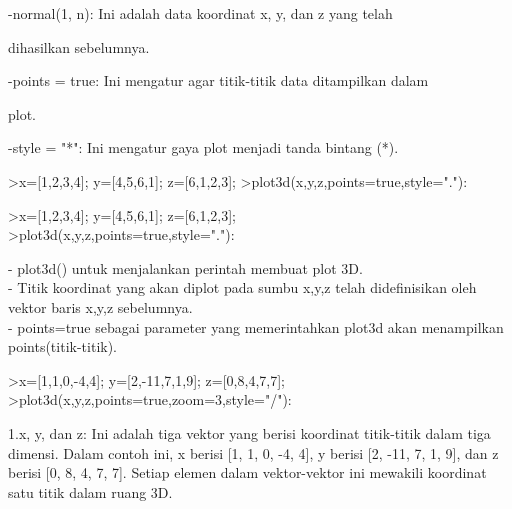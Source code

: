 \documentclass[a4paper,10pt]{article}
\begin{document}
\begin{eulernotebook}
\begin{eulercomment}
\begin{eulercomment}
\begin{eulercomment}
\begin{eulercomment}
\begin{eulercomment}
\begin{eulercomment}
\begin{eulercomment}
\begin{eulercomment}
\begin{eulercomment}
\end{eulercomment}
\begin{eulerttcomment}
 -normal(1, n): Ini adalah data koordinat x, y, dan z yang telah
\end{eulerttcomment}
\begin{eulercomment}
dihasilkan sebelumnya.\\
\end{eulercomment}
\begin{eulerttcomment}
 -points = true: Ini mengatur agar titik-titik data ditampilkan dalam
\end{eulerttcomment}
\begin{eulercomment}
plot.\\
\end{eulercomment}
\begin{eulerttcomment}
 -style = "*": Ini mengatur gaya plot menjadi tanda bintang (*).
\end{eulerttcomment}
\begin{eulerprompt}
>x=[1,2,3,4]; y=[4,5,6,1]; z=[6,1,2,3];
>plot3d(x,y,z,points=true,style="."):
\end{eulerprompt}
\begin{eulercomment}
\textgreater{}x=[1,2,3,4]; y=[4,5,6,1]; z=[6,1,2,3];\\
\textgreater{}plot3d(x,y,z,points=true,style="."):

- plot3d() untuk menjalankan perintah membuat plot 3D.\\
- Titik koordinat yang akan diplot pada sumbu x,y,z telah
didefinisikan oleh vektor baris x,y,z sebelumnya.\\
- points=true sebagai parameter yang memerintahkan plot3d akan
menampilkan points(titik-titik).

\end{eulercomment}
\begin{eulerprompt}
>x=[1,1,0,-4,4]; y=[2,-11,7,1,9]; z=[0,8,4,7,7];
>plot3d(x,y,z,points=true,zoom=3,style="/"):
\end{eulerprompt}
\begin{eulercomment}
1.x, y, dan z: Ini adalah tiga vektor yang berisi koordinat
titik-titik dalam tiga dimensi. Dalam contoh ini, x berisi [1, 1, 0,
-4, 4], y berisi [2, -11, 7, 1, 9], dan z berisi [0, 8, 4, 7, 7].
Setiap elemen dalam vektor-vektor ini mewakili koordinat satu titik
dalam ruang 3D.


\end{eulercomment}
\end{eulercomment}
\end{eulercomment}
\end{eulercomment}
\end{eulercomment}
\end{eulercomment}
\end{eulercomment}
\end{eulercomment}
\end{eulercomment}
\end{eulernotebook}
\end{document}
